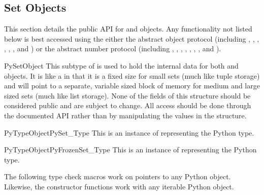 \subsection{Set Objects \label{setObjects}}


This section details the public API for  and 
objects.  Any functionality not listed below is best accessed using the
either the abstract object protocol (including
, ,
, ,
, , and
)
or the abstract number protocol (including
, ,
, ,
, ,
, and ).

\begin{ctypedesc}{PySetObject}
  This subtype of  is used to hold the internal data for
  both  and  objects.  It is like a
   in that it is a fixed size for small sets
  (much like tuple storage) and will point to a separate, variable sized
  block of memory for medium and large sized sets (much like list storage).
  None of the fields of this structure should be considered public and
  are subject to change.  All access should be done through the
  documented API rather than by manipulating the values in the structure.

\end{ctypedesc}

\begin{cvardesc}{PyTypeObject}{PySet_Type}
  This is an instance of  representing the Python
   type.
\end{cvardesc}

\begin{cvardesc}{PyTypeObject}{PyFrozenSet_Type}
  This is an instance of  representing the Python
   type.
\end{cvardesc}


The following type check macros work on pointers to any Python object.
Likewise, the constructor functions work with any iterable Python object.

